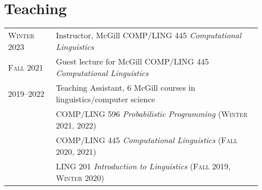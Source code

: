 \documentclass[11pt,a4paper]{article}
\begin{document}
  \section{Teaching}
  \begin{longtable}{p{1.7cm}|p{15cm}}
    \textsc{Winter 2023}&%
    Instructor, McGill COMP/LING 445 \emph{Computational Linguistics}\\
    \textsc{Fall 2021}&%
    Guest lecture for McGill COMP/LING 445 \emph{Computational Linguistics}\\
    \textsc{2019--2022}&%
    Teaching Assistant, 6 McGill courses in linguistics/computer science\\
                       &\quad COMP/LING 596 \emph{Probabilistic Programming}
                       (\textsc{Winter 2021, 2022)}\\
                       &\quad COMP/LING 445 \emph{Computational Linguistics}
                       (\textsc{Fall 2020, 2021})\\
                       &\quad LING 201 \emph{Introduction to Linguistics}
                       (\textsc{Fall 2019}, \textsc{Winter 2020})\\
  \end{longtable}
\end{document}
